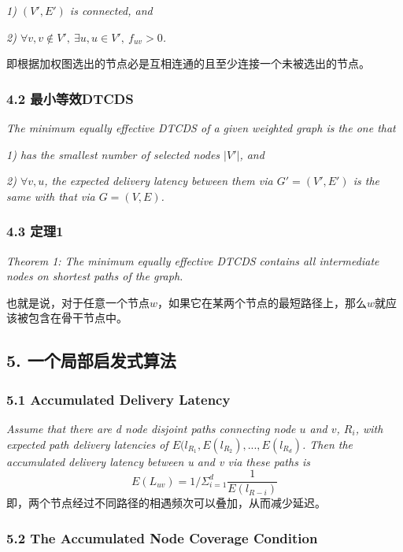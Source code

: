 \documentclass[lang=cn,11pt]{elegantpaper}
\begin{document}
	\emph{​1) $(V',E')$ is connected, and}
	
	\emph{​2) $\forall v,v\notin V',\ \exists u,u\in V',\ f_{uv}>0$.}
	
	即根据加权图选出的节点必是互相连通的且至少连接一个未被选出的节点。
	
	\subsubsection*{4.2 最小等效DTCDS}
	
	\emph{The minimum equally effective DTCDS of a given weighted graph is the one that }
	
	\emph{1)  has the smallest number of selected nodes $|V'|$, and}
	
	\emph{2)  $\forall v,u$, the expected delivery latency between them via $G'=(V',E')$ is the same with that via $G = (V,E)$.}
	
	\subsubsection*{4.3 定理1}
	
	\emph{Theorem 1: The minimum equally effective DTCDS contains all intermediate nodes on shortest paths of the graph.}
	
	也就是说，对于任意一个节点$w$，如果它在某两个节点的最短路径上，那么$w$就应该被包含在骨干节点中。
	
	\subsection*{5. 一个局部启发式算法}
	
	\subsubsection*{5.1 Accumulated Delivery Latency}
	
	\emph{Assume that there are d node disjoint paths connecting node $u$ and $v$, $R_i$, with expected path delivery latencies of $E(l_{R_1}, E(l_{R_2}),...,E(l_{R_d})$. Then the accumulated delivery latency between u and v via these paths is}
	$$
	E(L_{uv})=1/\Sigma^{d}_{i=1}\frac{1}{E(l_{R-i})}
	$$
	即，两个节点经过不同路径的相遇频次可以叠加，从而减少延迟。
	
	\subsubsection*{5.2 The Accumulated Node Coverage Condition}
	
\end{document}
